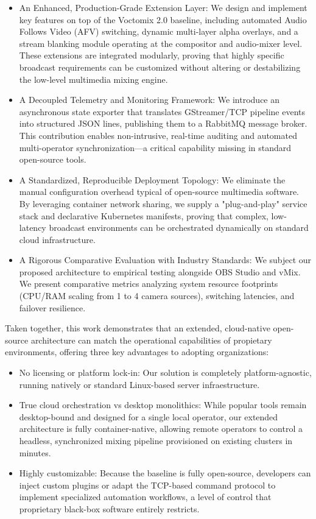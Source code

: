 \documentclass[electronics,article,submit,pdftex,moreauthors]{Definitions/mdpi}
\begin{document}
\begin{itemize}
\item An Enhanced, Production-Grade Extension Layer: We design and implement key features on top of the Voctomix 2.0 baseline, including automated Audio Follows Video (AFV) switching, dynamic multi-layer alpha overlays, and a stream blanking module operating at the compositor and audio-mixer level. These extensions are integrated modularly, proving that highly specific broadcast requirements can be customized without altering or destabilizing the low-level multimedia mixing engine.
\item A Decoupled Telemetry and Monitoring Framework: We introduce an asynchronous state exporter that translates GStreamer/TCP pipeline events into structured JSON lines, publishing them to a RabbitMQ message broker. This contribution enables non-intrusive, real-time auditing and automated multi-operator synchronization—a critical capability missing in standard open-source tools.
\item A Standardized, Reproducible Deployment Topology: We eliminate the manual configuration overhead typical of open-source multimedia software. By leveraging container network sharing, we supply a "plug-and-play" service stack and declarative Kubernetes manifests, proving that complex, low-latency broadcast environments can be orchestrated dynamically on standard cloud infrastructure.
\item A Rigorous Comparative Evaluation with Industry Standards: We subject our proposed architecture to empirical testing alongside OBS Studio and vMix. We present comparative metrics analyzing system resource footprints (CPU/RAM scaling from 1 to 4 camera sources), switching latencies, and failover resilience.
\end{itemize}

Taken together, this work demonstrates that an extended, cloud-native open-source architecture can match the operational capabilities of propietary environments, offering three key advantages to adopting organizations:

\begin{itemize}
    \item No licensing or platform lock-in: Our solution is completely platform-agnostic, running natively or standard Linux-based server infraestructure.
    \item True cloud orchestration vs desktop monolithics: While popular tools remain desktop-bound and designed for a single local operator, our extended architecture is fully container-native, allowing remote operators to control a headless, synchronized mixing pipeline provisioned on existing clusters in minutes.
    \item Highly customizable: Because the baseline is fully open-source, developers can inject custom plugins or adapt the TCP-based command protocol to implement specialized automation workflows, a level of control that proprietary black-box software entirely restricts.
\end{itemize}
\end{document}
